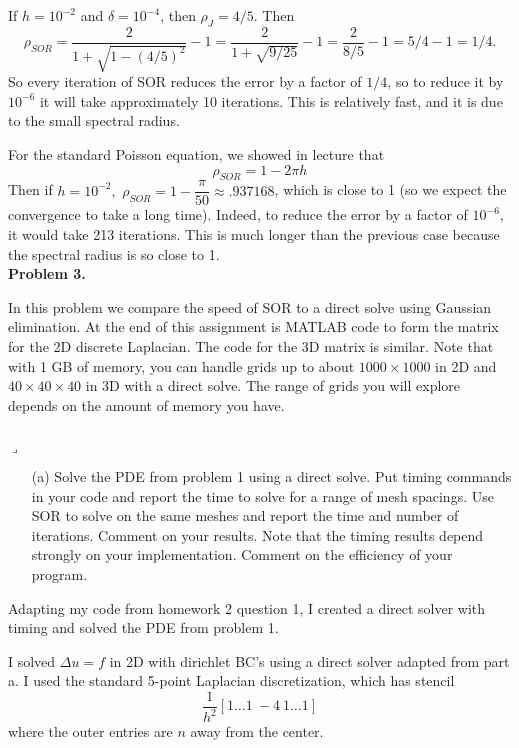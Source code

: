 \documentclass[12pt]{article}
\newenvironment{myprob}[1]
    {%
    \noindent{\Huge$\ulcorner$}\textbf{#1.}\begin{em}
    }
    { 
    \end{em} \\ \hphantom{l} \hfill {\Huge$\lrcorner$} }
\begin{document}
If $h =10^{-2}$ and $\delta = 10^{-4}$, then $\rho_J = 4/5$.  Then 
$$\rho_{SOR} = \dfrac{2}{1+\sqrt{1-(4/5)^2}} - 1 =  \dfrac{2}{1+\sqrt{9/25}} - 1
= \dfrac{2}{8/5} -1 = 5/4 -1 = 1/4.$$
So every iteration of SOR reduces the error by a factor of $1/4$, so to reduce it by $10^{-6}$ it will take approximately 10 iterations.  This is relatively fast, and it is due to the small spectral radius.

For the standard Poisson equation, we showed in lecture that $$\rho_{SOR} = 1 - 2\pi h$$
Then if $h=10^{-2},$ 
$\rho_{SOR} =1 - \dfrac{\pi }{50} \approx .937168$, which is close to 1 (so we expect the convergence to take a long time).  Indeed, to reduce the error by a factor of $10^{-6}$, it would take 213 iterations.  This is much longer than the previous case because the spectral radius is so close to 1.\\



\begin{myprob}{Problem 3}
 In this problem we compare the speed of SOR to a direct solve using Gaussian elimination. At the end of this assignment is MATLAB code to form the matrix for the 2D discrete Laplacian. The code for the 3D matrix is similar. Note that with 1 GB of memory, you can handle grids up to about $1000 \times 1000$ in 2D and $40 \times40\times 40$ in 3D with a direct solve. The range of grids
you will explore depends on the amount of memory you have.
\end{myprob}

\begin{itemize}
\item[(a)] Solve the PDE from problem 1 using a direct solve. Put timing commands in your code and report the time to solve for a range of mesh spacings. Use SOR to solve on the same meshes and report the time and number of iterations. Comment on your results. Note that the timing results depend strongly on your implementation. Comment on the efficiency of your program.
\end{itemize}
Adapting my code from homework 2 question 1, I created a direct solver with timing and solved the PDE from problem 1.  

I solved $\Delta u = f$ in 2D with dirichlet BC's using a direct solver adapted from part a.  I used the standard 5-point Laplacian discretization, which has stencil
$$\dfrac{1}{h^2}[1 \dots 1 \ -4 \ 1 \dots 1]$$
where the outer entries are $n$ away from the center. 
\end{document}
